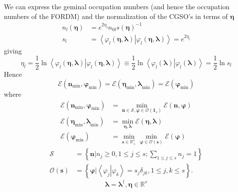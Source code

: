 \documentclass[aps,preprint]{revtex4}%
\begin{document}
We can express the geminal occupation numbers (and hence the occupation
numbers of the FORDM) and the normalization of the CGSO's in terms of
$\mathbf{\eta}$
\begin{align}
n_{l}\left(  \mathbf{\eta}\right)   &  =e^{2\eta_{l}}n_{0l}\mathit{s}\left(
\mathbf{\eta}\right)  ^{-1}\nonumber\\
s_{l}  &  =\left\langle \left.  \varphi_{l}\left(  \mathbf{\eta,\lambda
}\right)  \right\vert \varphi_{l}\left(  \mathbf{\eta,\lambda}\right)
\right\rangle =e^{2\eta_{l}}%
\end{align}
giving
\begin{equation}
\eta_{l}=\frac{1}{2}\ln\left\langle \left.  \varphi_{l}\left(  \mathbf{\eta
,\lambda}\right)  \right\vert \varphi_{l}\left(  \mathbf{\eta,\lambda}\right)
\right\rangle \equiv\frac{1}{2}\ln\left\langle \left.  \varphi_{l}\left(
\mathbf{\lambda}\right)  \right\vert \varphi_{l}\left(  \mathbf{\lambda
}\right)  \right\rangle =\frac{1}{2}\ln s_{l}%
\end{equation}
Hence%
\begin{equation}
\mathcal{E}\left(  \mathbf{n}_{\min}\mathbf{,\varphi}_{\min}\right)
=\mathcal{E}\left(  \mathbf{\eta}_{\min}\mathbf{,\lambda}_{\min}\right)
=\mathcal{E}\left(  \mathbf{\varphi}_{\min}\right)
\end{equation}
where
\begin{align}
\mathcal{E}\left(  \mathbf{n}_{\min}\mathbf{,\varphi}_{\min}\right)   &
=\min_{\mathbf{n\in\mathcal{S},\varphi\in}\mathcal{O}\left(  \mathbf{1}%
_{s}\right)  }\mathcal{E}\left(  \mathbf{n,\varphi}\right) \\
\mathcal{E}\left(  \mathbf{\eta}_{\min}\mathbf{,\lambda}_{\min}\right)   &
=\min_{\mathbf{\eta,\lambda}}\mathcal{E}\left(  \mathbf{\eta,\lambda}\right)
\\
\mathcal{E}\left(  \mathbf{\varphi}_{\min}\right)   &  =\min_{\mathbf{s\in
}\mathbb{R}_{+}^{s}}\min_{\mathbf{\varphi\in}\mathcal{O}\left(  \mathbf{s}%
\right)  }\mathcal{E}\left(  \mathbf{\varphi}\right)
\end{align}%
\begin{align}
\mathcal{S}  &  =\left\{  \left.  \mathbf{n}\right\vert n_{j}\geq0,1\leq j\leq
s;\sum_{1\leq j\leq s}n_{j}=1\right\} \\
\mathcal{O}\left(  \mathbf{s}\right)   &  =\left\{  \left.  \mathbf{\varphi
}\right\vert \left\langle \left.  \varphi_{j}\right\vert \varphi
_{k}\right\rangle =s_{j}\delta_{jk},1\leq j,k\leq s\right\}  .
\end{align}%
\begin{equation}
\mathbf{\lambda}=\mathbf{\lambda}^{\dagger},\mathbf{\eta\in}\mathbb{R}^{s}%
\end{equation}%
\end{document}
